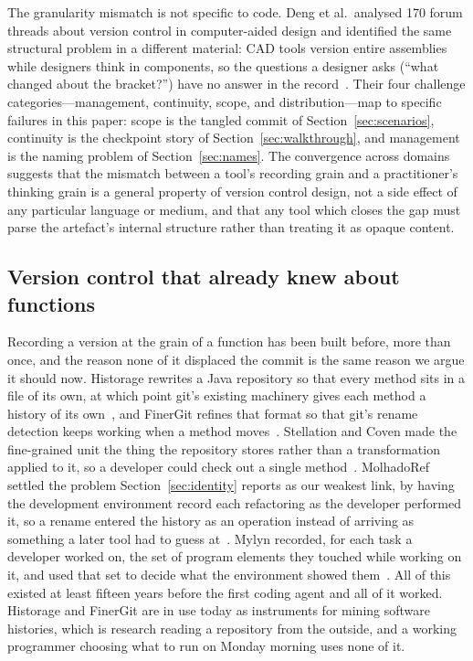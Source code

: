 The granularity mismatch is not specific to code. Deng et al.\ analysed 170 forum
threads about version control in computer-aided design and identified the same
structural problem in a different material: CAD tools version entire assemblies
while designers think in components, so the questions a designer asks (``what
changed about the bracket?'') have no answer in the record~\cite{deng2026untangling}.
Their four challenge categories---management, continuity, scope, and
distribution---map to specific failures in this paper: scope is the tangled commit
of Section~\ref{sec:scenarios}, continuity is the checkpoint story of
Section~\ref{sec:walkthrough}, and management is the naming problem of
Section~\ref{sec:names}. The convergence across domains suggests that the mismatch
between a tool's recording grain and a practitioner's thinking grain is a general
property of version control design, not a side effect of any particular language or
medium, and that any tool which closes the gap must parse the artefact's internal
structure rather than treating it as opaque content.

\subsection{Version control that already knew about functions}

Recording a version at the grain of a function has been built before, more than
once, and the reason none of it displaced the commit is the same reason we argue it
should now. Historage rewrites a Java repository so that every method sits in a file of
its own, at which point git's existing machinery gives each method a history of
its own~\cite{hata2011}, and FinerGit refines that format so that git's rename
detection keeps working when a method moves~\cite{higo2020}. Stellation and Coven
made the fine-grained unit the thing the repository stores rather than a
transformation applied to it, so a developer could check out a single
method~\cite{chucarroll2002,chucarroll2000}. MolhadoRef settled the problem
Section~\ref{sec:identity} reports as our weakest link, by having the development
environment record each refactoring as the developer performed it, so a rename
entered the history as an operation instead of arriving as something a later tool
had to guess at~\cite{dig2007}. Mylyn recorded, for each task a developer worked
on, the set of program elements they touched while working on it, and used that set
to decide what the environment showed them~\cite{kersten2006}. All of this existed
at least fifteen years before the first coding agent and all of it worked.
Historage and FinerGit are in use today as instruments for mining software
histories, which is research reading a repository from the outside, and a working
programmer choosing what to run on Monday morning uses none of it.

